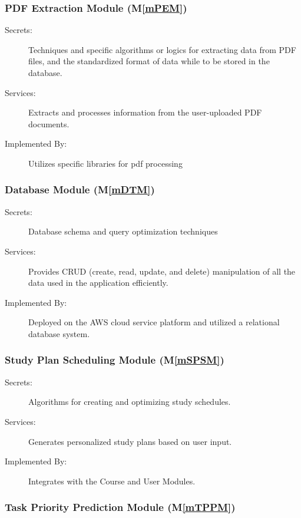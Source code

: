 \documentclass[12pt, titlepage]{article}
\newcommand{\mref}[1]{M\ref{#1}}
\begin{document}
\subsubsection{PDF Extraction Module (\mref{mPEM})}

\begin{description}
\item[Secrets:] Techniques and specific algorithms or logics for extracting data from PDF files, and the standardized format of data while to be stored in the database. 
\item[Services:] Extracts and processes information from the user-uploaded PDF documents.
\item[Implemented By:] Utilizes specific libraries for pdf processing
\end{description}

\subsubsection{Database Module (\mref{mDTM})}

\begin{description}
\item[Secrets:] Database schema and query optimization techniques
\item[Services:] Provides CRUD (create, read, update, and delete) manipulation of all the data used in the application efficiently. 
\item[Implemented By:] Deployed on the AWS cloud service platform and utilized a relational database system.  
\end{description}

\subsubsection{Study Plan Scheduling Module (\mref{mSPSM})}

\begin{description}
\item[Secrets:] Algorithms for creating and optimizing study schedules. 
\item[Services:] Generates personalized study plans based on user input. 
\item[Implemented By:] Integrates with the Course and User Modules.
\end{description}

\subsubsection{Task Priority Prediction Module (\mref{mTPPM})}
\end{document}
